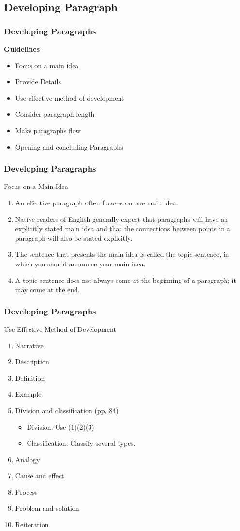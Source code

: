 \documentclass{beamer}
\begin{document}
\subsection{Developing Paragraph}
\begin{frame}
\frametitle{Developing Paragraphs}
\textbf{Guidelines}
\begin{itemize}
\item Focus on a main idea
\item Provide Details
\item Use effective method of development
\item Consider paragraph length
\item Make paragraphs flow
\item Opening and concluding Paragraphs
\end{itemize}
\end{frame}
\begin{frame}
\frametitle{Developing Paragraphs}
\begin{block}{Focus on a Main Idea}
\begin{enumerate}
\item An effective paragraph often focuses on one main idea.
\item Native readers of English generally expect that paragraphs will have an explicitly stated main idea and that the connections between points in a  paragraph will also be stated explicitly.
\item The sentence that presents the main idea is called the topic sentence, in which you should announce your main idea.
\item A topic sentence does not always come at the beginning of a  paragraph; it may come at the end.
\end{enumerate}
\end{block}
\end{frame}
\begin{frame}
\frametitle{Developing Paragraphs}
\begin{block}{Use Effective Method of Development}
\begin{enumerate}
\item Narrative
\item Description
\item Definition
\item Example
\item Division and classification (pp. 84)
	\begin{itemize}
	\item Division: Use (1)(2)(3)
	\item Classification: Classify several types.
	\end{itemize}
\item Analogy
\item Cause and effect
\item Process
\item Problem and solution
\item Reiteration
\end{enumerate}
\end{block}
\end{frame}
\end{document}
